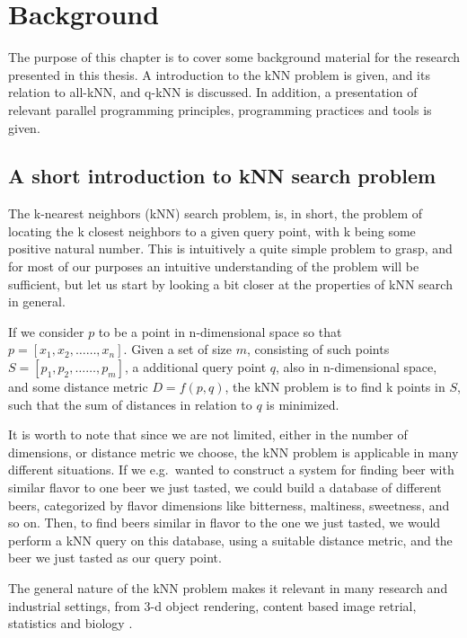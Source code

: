 \chapter{Background}

The purpose of this chapter is to cover some background material for the research presented in this thesis. A introduction to the kNN problem is given, and its relation to all-kNN, and q-kNN is discussed. In addition, a presentation of relevant parallel programming principles, programming practices and tools is given.

\section{A short introduction to kNN search problem} %
\label{a_short_introduction_to_kNN_search_problem}

The k-nearest neighbors (kNN) search problem, is, in short, the problem of locating the k closest neighbors to a given query point, with k being some positive natural number. This is intuitively a quite simple problem to grasp, and for most of our purposes an intuitive understanding of the problem will be sufficient, but let us start by looking a bit closer at the properties of kNN search in general.

If we consider $p$ to be a point in n-dimensional space so that $p = [x_1, x_2,\dots{\dots}, x_n]$. Given a set of size $m$, consisting of such points $S = [p_1, p_2,\dots{\dots}, p_m]$, a additional query point $q$, also in n-dimensional space, and some distance metric $D = f(p, q)$, the kNN problem is to find k points in $S$, such that the sum of distances in relation to $q$ is minimized.

It is worth to note that since we are not limited, either in the number of dimensions, or distance metric we choose, the kNN problem is applicable in many different situations. If we e.g.\ wanted to construct a system for finding beer with similar flavor to one beer we just tasted, we could build a database of different beers, categorized by flavor dimensions like bitterness, maltiness, sweetness, and so on. Then, to find beers similar in flavor to the one we just tasted, we would perform a kNN query on this database, using a suitable distance metric, and the beer we just tasted as our query point.

The general nature of the kNN problem makes it relevant in many research and industrial settings, from 3-d object rendering, content based image retrial, statistics and biology \citep[Introduction]{Garcia2010}.

